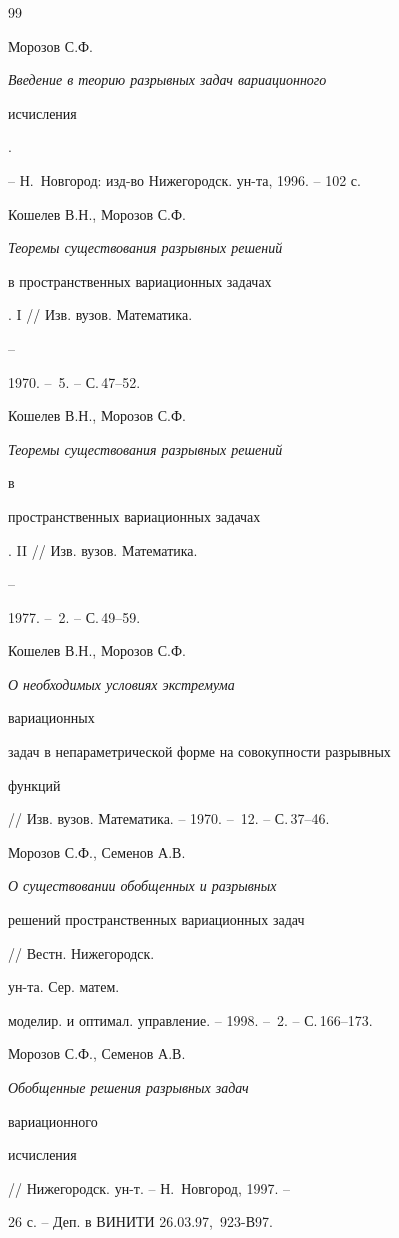 \begin{thebibliography}{99} 


 




Морозов С.Ф. {\em Введение в теорию разрывных задач вариационного 


исчисления}. 


-- Н.~Новгород: изд-во Нижегородск. ун-та, 1996. -- 102 с. 




Кошелев В.Н., Морозов С.Ф. {\em Теоремы существования разрывных решений 


в пространственных вариационных задачах}. I // Изв. вузов. Математика. 


-- 


1970. -- \No\,5. -- С.\,47--52. 




Кошелев В.Н., Морозов С.Ф. {\em Теоремы существования разрывных решений 


в 


пространственных вариационных задачах}. II // Изв. вузов. Математика. 


-- 


1977. -- \No\,2. -- С.\,49--59. 




Кошелев В.Н., Морозов С.Ф. {\em О необходимых условиях экстремума 


вариационных 


задач в непараметрической форме на совокупности разрывных 


функций} // Изв. вузов. Математика. -- 1970. -- \No\,12. -- С.\,37--46. 




Морозов С.Ф., Семенов А.В. {\em О существовании обобщенных и разрывных 


решений пространственных вариационных задач} // Вестн. Нижегородск. 


ун-та. Сер. матем. 


моделир. и оптимал. управление. -- 1998. -- \No\,2. -- С.\,166--173. 




Морозов С.Ф., Семенов А.В. {\em Обобщенные решения разрывных задач 


вариационного 


исчисления} // Нижегородск. ун-т. -- Н.~Новгород, 1997. -- 


26 с. -- Деп. в ВИНИТИ 26.03.97, \No\,923-В97. 



\end{thebibliography}
